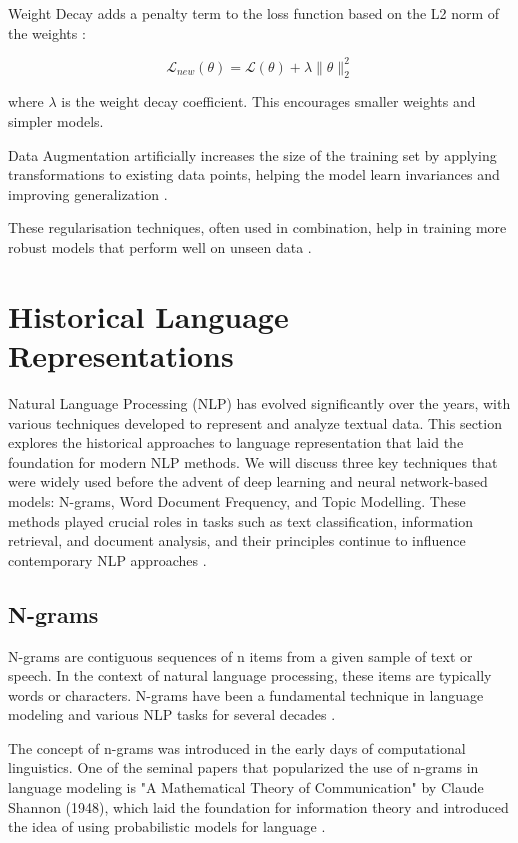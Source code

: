\documentclass[a4paper, oneside]{discothesis}
\begin{document}
Weight Decay adds a penalty term to the loss function based on the L2 norm of the weights \cite{krogh1992simple}:

\begin{equation}
    \mathcal{L}_{new}(\theta) = \mathcal{L}(\theta) + \lambda \|\theta\|_2^2
\end{equation}

where $\lambda$ is the weight decay coefficient. This encourages smaller weights and simpler models.

Data Augmentation artificially increases the size of the training set by applying transformations to existing data points, helping the model learn invariances and improving generalization \cite{shorten2019survey}.

These regularisation techniques, often used in combination, help in training more robust models that perform well on unseen data \cite{kukavcka2017regularization}.

\section{Historical Language Representations}

Natural Language Processing (NLP) has evolved significantly over the years, with various techniques developed to represent and analyze textual data. This section explores the historical approaches to language representation that laid the foundation for modern NLP methods. We will discuss three key techniques that were widely used before the advent of deep learning and neural network-based models: N-grams, Word Document Frequency, and Topic Modelling. These methods played crucial roles in tasks such as text classification, information retrieval, and document analysis, and their principles continue to influence contemporary NLP approaches \cite{manning1999foundations}.

\subsection{N-grams}
N-grams are contiguous sequences of n items from a given sample of text or speech. In the context of natural language processing, these items are typically words or characters. N-grams have been a fundamental technique in language modeling and various NLP tasks for several decades \cite{jurafsky2000speech}.

The concept of n-grams was introduced in the early days of computational linguistics. One of the seminal papers that popularized the use of n-grams in language modeling is "A Mathematical Theory of Communication" by Claude Shannon (1948), which laid the foundation for information theory and introduced the idea of using probabilistic models for language \cite{shannon1948mathematical}.
\end{document}
